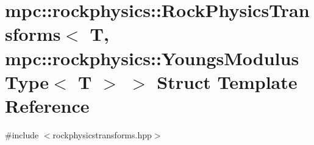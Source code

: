 \hypertarget{structmpc_1_1rockphysics_1_1_rock_physics_transforms_3_01_t_00_01mpc_1_1rockphysics_1_1_youngs_modulus_type_3_01_t_01_4_01_4}{}\section{mpc\+:\+:rockphysics\+:\+:Rock\+Physics\+Transforms$<$ T, mpc\+:\+:rockphysics\+:\+:Youngs\+Modulus\+Type$<$ T $>$ $>$ Struct Template Reference}
\label{structmpc_1_1rockphysics_1_1_rock_physics_transforms_3_01_t_00_01mpc_1_1rockphysics_1_1_youngs_modulus_type_3_01_t_01_4_01_4}


{\ttfamily \#include $<$rockphysicstransforms.\+hpp$>$}

